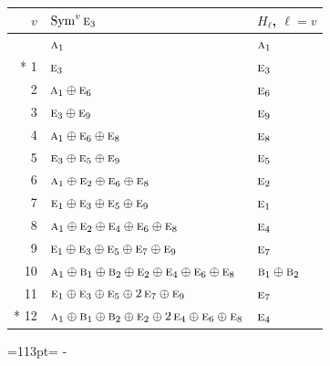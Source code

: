 \documentclass[10pt,a4paper]{article}
\newcommand{\needspace}[1]{\par\penalty-100\begingroup\dimen0=#1\relax\dimen2=\pagegoal
  \advance\dimen2-\pagetotal\ifdim\dimen0>\dimen2\relax\ifdim\dimen2>0pt\vfil\break\fi\fi
  \endgroup}
\numberwithin{equation}{section}
\newcommand{\irr}[1]{\text{\normalfont\scshape #1}}
\begin{document}
{\small\begin{longtable}{@{}rll@{}}\toprule
$v$ & $\operatorname{Sym}^{v}\irr{e}_{3}$ & $H_\ell$, $\ell = v$\\\midrule\endhead
\bottomrule\endfoot\endlastfoot
0 & $\irr{a}_{1}$ & $\irr{a}_{1}$\\*
1 & $\irr{e}_{3}$ & $\irr{e}_{3}$\\
2 & $\irr{a}_{1} \oplus \irr{e}_{6}$ & $\irr{e}_{6}$\\
3 & $\irr{e}_{3} \oplus \irr{e}_{9}$ & $\irr{e}_{9}$\\
4 & $\irr{a}_{1} \oplus \irr{e}_{6} \oplus \irr{e}_{8}$ & $\irr{e}_{8}$\\
5 & $\irr{e}_{3} \oplus \irr{e}_{5} \oplus \irr{e}_{9}$ & $\irr{e}_{5}$\\
6 & $\irr{a}_{1} \oplus \irr{e}_{2} \oplus \irr{e}_{6} \oplus \irr{e}_{8}$ & $\irr{e}_{2}$\\
7 & $\irr{e}_{1} \oplus \irr{e}_{3} \oplus \irr{e}_{5} \oplus \irr{e}_{9}$ & $\irr{e}_{1}$\\
8 & $\irr{a}_{1} \oplus \irr{e}_{2} \oplus \irr{e}_{4} \oplus \irr{e}_{6} \oplus \irr{e}_{8}$ & $\irr{e}_{4}$\\
9 & $\irr{e}_{1} \oplus \irr{e}_{3} \oplus \irr{e}_{5} \oplus \irr{e}_{7} \oplus \irr{e}_{9}$ & $\irr{e}_{7}$\\
10 & $\irr{a}_{1} \oplus \irr{b}_{1} \oplus \irr{b}_{2} \oplus \irr{e}_{2} \oplus \irr{e}_{4} \oplus \irr{e}_{6} \oplus \irr{e}_{8}$ & $\irr{b}_{1} \oplus \irr{b}_{2}$\\
11 & $\irr{e}_{1} \oplus \irr{e}_{3} \oplus \irr{e}_{5} \oplus 2\,\irr{e}_{7} \oplus \irr{e}_{9}$ & $\irr{e}_{7}$\\*
12 & $\irr{a}_{1} \oplus \irr{b}_{1} \oplus \irr{b}_{2} \oplus \irr{e}_{2} \oplus 2\,\irr{e}_{4} \oplus \irr{e}_{6} \oplus \irr{e}_{8}$ & $\irr{e}_{4}$\\
\bottomrule\end{longtable}}
\needspace{113pt}
\end{document}
